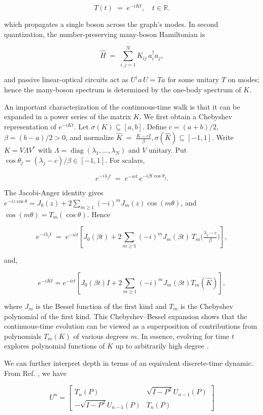\documentclass[11pt]{article}
\begin{document}
$$
T(t)\;=\;e^{-iKt},\quad t\in\mathbb R.
$$

which propagates a single boson across the graph’s modes. In second quantization, the number-preserving many-boson Hamiltonian is

$$
\widehat H \;=\; \sum_{i,j=1}^{N} K_{ij}\,a_i^\dagger a_j,
$$

and passive linear-optical circuits act as $U^\dagger a\,U = T a$ for some unitary $T$ on modes; hence the many-boson spectrum is determined by the one-body spectrum of $K$.

An important characterization of the continuous-time walk is that it can be expanded in a power series of the matrix $K$. We first obtain a Chebyshev representation of $e^{-iKt}$. Let $\sigma(K)\subseteq[a,b]$. Define $c=(a+b)/2$, $\beta=(b-a)/2>0$, and normalize $\widehat K \;=\;\frac{K-cI}{\beta}, \sigma(\widehat K)\subseteq[-1,1].$
 Write $K=V\Lambda V^\ast$ with $\Lambda=\operatorname{diag}(\lambda_1,\dots,\lambda_N)$ and $V$ unitary. Put $\cos\theta_j=(\lambda_j-c)/\beta\in[-1,1]$. For scalars,

$$
e^{-i\lambda_j t} \;=\; e^{-ict}\,e^{-i\beta t\cos\theta_j}.
$$

The Jacobi-Anger identity gives $e^{-iz\cos\theta}=J_0(z)+2\sum_{m\ge1}(-i)^mJ_m(z)\cos(m\theta)$, and $\cos(m\theta)=T_m(\cos\theta)$. Hence

$$
e^{-i\lambda_j t} \;=\; e^{-ict}\!\left[J_0(\beta t)+2\sum_{m\ge1}(-i)^m J_m(\beta t)\,T_m\!\Big(\tfrac{\lambda_j-c}{\beta}\Big)\right],
$$

and,

$$
e^{-i K t}=e^{-i c t}\left[J_0(\beta t) I+2 \sum_{m \geq 1}(-i)^m J_m(\beta t) T_m(\widehat{K})\right],
$$

where $J_m$ is the Bessel function of the first kind and $T_m$ is the Chebyshev polynomial of the first kind. This Chebyshev--Bessel expansion shows that the continuous-time evolution can be viewed as a superposition of contributions from polynomials $T_m(K)$ of various degrees $m$. In essence, evolving for time $t$ explores polynomial functions of $K$ up to arbitrarily high degree \citep{tal1984chebyshev,howlett1966handbook}.

We can further interpret depth in terms of an equivalent discrete-time dynamic. From Ref. \cite{apers2024quantum}, we have

$$
U^n=\left[\begin{array}{cc}T_n(P) & \sqrt{I-P^2} U_{n-1}(P) \\-\sqrt{I-P^2} U_{n-1}(P) & T_n(P)\end{array}\right]
$$
\end{document}
